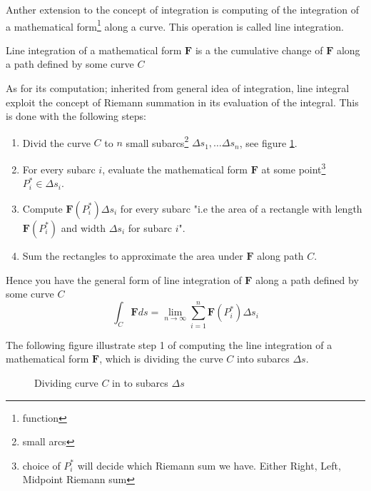 \documentclass[../main.tex]{subfiles}
\begin{document}
	
	\par Anther extension to the concept of integration is computing of the integration of a mathematical form\footnote{function} along a curve. This operation is called line integration.
	\begin{definition}
			Line integration of a mathematical form $\mathbf{F}$ is a the cumulative change of $\mathbf{F}$ along a path defined by some curve $C$ 
	\end{definition}
	
	\par As for its computation; inherited from general idea of integration, line integral exploit the concept of Riemann summation in its evaluation of the integral. This is done with the following steps:
	\begin{enumerate}
		\item Divid the curve $C$ to $n$ small subarcs\footnote{small arcs} $\Delta s_1, \dots \Delta s_n$, see figure \ref{fig: parametric curve}.
		\item For every subarc $i$, evaluate the mathematical form $\mathbf{F}$ at some point\footnote{choice of $P_i^*$ will decide which Riemann sum we have. Either Right, Left, Midpoint Riemann sum} $P_i^* \in \Delta s_i$.
		\item Compute $\mathbf{F}(P_i^*) \Delta s_i$ for every subarc "i.e the area of a rectangle with length $\mathbf{F}(P_i^*)$ and width $\Delta s_i$ for subarc $i$".
		\item Sum the rectangles to approximate the area under $\mathbf{F}$ along path $C$.
	\end{enumerate} 
	
	\par Hence you have the general form of line integration of $\mathbf{F}$ along a path defined by some curve $C$
	\begin{equation}
		\int_C \mathbf{F} ds = \lim_{n \rightarrow \infty} \sum_{i=1}^n \mathbf{F}(P_i^*) \Delta s_i 
	\end{equation}
 	
 	\par The following figure illustrate step 1 of computing the line integration of a mathematical form $\mathbf{F}$, which is dividing the curve $C$ into subarcs $\Delta s$.
	\begin{figure}[h]
		\centering
		\caption{Dividing curve $C$ in to subarcs $\Delta s$}
		\label{fig: parametric curve}	
	\end{figure}
\end{document}
